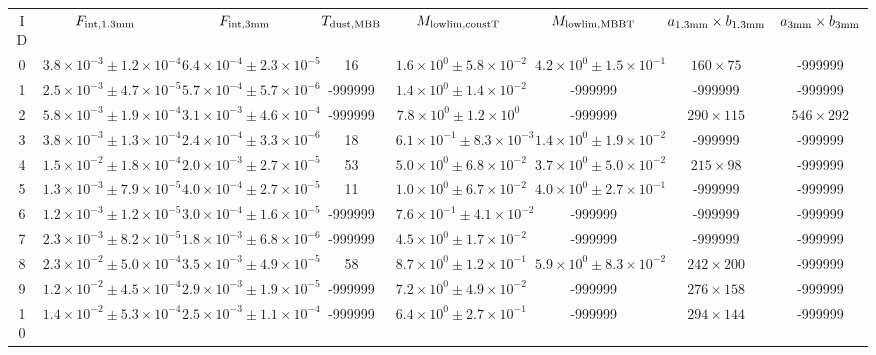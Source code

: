 \begin{table}
\begin{tabular}{cccccccc}
ID & $F_{\rm int, 1.3mm}$ & $F_{\rm int, 3mm}$ & $T_{\rm dust, MBB}$ & $M_{\rm lowlim, constT}$ & $M_{\rm lowlim, MBBT}$ & $a_{\rm 1.3mm}\times b_{\rm 1.3mm}$ & $a_{\rm 3mm}\times b_{\rm 3mm}$ \\
0 & $3.8\times10^{-3}\pm 1.2\times10^{-4}$ & $6.4\times10^{-4}\pm 2.3\times10^{-5}$ & 16 & $1.6\times10^{0}\pm 5.8\times10^{-2}$ & $4.2\times10^{0}\pm 1.5\times10^{-1}$ & $160\times 75$ & -999999 \\
1 & $2.5\times10^{-3}\pm 4.7\times10^{-5}$ & $5.7\times10^{-4}\pm 5.7\times10^{-6}$ & -999999 & $1.4\times10^{0}\pm 1.4\times10^{-2}$ & -999999 & -999999 & -999999 \\
2 & $5.8\times10^{-3}\pm 1.9\times10^{-4}$ & $3.1\times10^{-3}\pm 4.6\times10^{-4}$ & -999999 & $7.8\times10^{0}\pm 1.2\times10^{0}$ & -999999 & $290\times 115$ & $546\times 292$ \\
3 & $3.8\times10^{-3}\pm 1.3\times10^{-4}$ & $2.4\times10^{-4}\pm 3.3\times10^{-6}$ & 18 & $6.1\times10^{-1}\pm 8.3\times10^{-3}$ & $1.4\times10^{0}\pm 1.9\times10^{-2}$ & -999999 & -999999 \\
4 & $1.5\times10^{-2}\pm 1.8\times10^{-4}$ & $2.0\times10^{-3}\pm 2.7\times10^{-5}$ & 53 & $5.0\times10^{0}\pm 6.8\times10^{-2}$ & $3.7\times10^{0}\pm 5.0\times10^{-2}$ & $215\times 98$ & -999999 \\
5 & $1.3\times10^{-3}\pm 7.9\times10^{-5}$ & $4.0\times10^{-4}\pm 2.7\times10^{-5}$ & 11 & $1.0\times10^{0}\pm 6.7\times10^{-2}$ & $4.0\times10^{0}\pm 2.7\times10^{-1}$ & -999999 & -999999 \\
6 & $1.2\times10^{-3}\pm 1.2\times10^{-5}$ & $3.0\times10^{-4}\pm 1.6\times10^{-5}$ & -999999 & $7.6\times10^{-1}\pm 4.1\times10^{-2}$ & -999999 & -999999 & -999999 \\
7 & $2.3\times10^{-3}\pm 8.2\times10^{-5}$ & $1.8\times10^{-3}\pm 6.8\times10^{-6}$ & -999999 & $4.5\times10^{0}\pm 1.7\times10^{-2}$ & -999999 & -999999 & -999999 \\
8 & $2.3\times10^{-2}\pm 5.0\times10^{-4}$ & $3.5\times10^{-3}\pm 4.9\times10^{-5}$ & 58 & $8.7\times10^{0}\pm 1.2\times10^{-1}$ & $5.9\times10^{0}\pm 8.3\times10^{-2}$ & $242\times 200$ & -999999 \\
9 & $1.2\times10^{-2}\pm 4.5\times10^{-4}$ & $2.9\times10^{-3}\pm 1.9\times10^{-5}$ & -999999 & $7.2\times10^{0}\pm 4.9\times10^{-2}$ & -999999 & $276\times 158$ & -999999 \\
10 & $1.4\times10^{-2}\pm 5.3\times10^{-4}$ & $2.5\times10^{-3}\pm 1.1\times10^{-4}$ & -999999 & $6.4\times10^{0}\pm 2.7\times10^{-1}$ & -999999 & $294\times 144$ & -999999 \\

\end{tabular}
\end{table}
